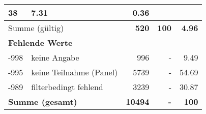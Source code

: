 \begin{longtable}{lXrrr}
       \num{38} &
       \num[round-mode=places,round-precision=2]{7.31} &
         \num[round-mode=places,round-precision=2]{0.36} \\
     \midrule
     \multicolumn{2}{l}{Summe (gültig)} &
       \textbf{\num{520}} &
     \textbf{\num{100}} &
       \textbf{\num[round-mode=places,round-precision=2]{4.96}} \\
     \multicolumn{5}{l}{\textbf{Fehlende Werte}}\\
       -998 &
       keine Angabe &
         \num{996} &
        - &
         \num[round-mode=places,round-precision=2]{9.49} \\
       -995 &
       keine Teilnahme (Panel) &
         \num{5739} &
        - &
         \num[round-mode=places,round-precision=2]{54.69} \\
       -989 &
       filterbedingt fehlend &
         \num{3239} &
        - &
         \num[round-mode=places,round-precision=2]{30.87} \\
     \midrule
     \multicolumn{2}{l}{\textbf{Summe (gesamt)}} &
          \textbf{\num{10494}} &
        \textbf{-} &
        \textbf{\num{100}} \\
     \bottomrule
     \end{longtable}
     
